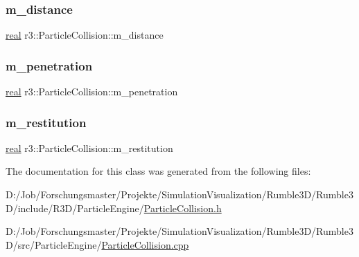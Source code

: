 \subsubsection{\texorpdfstring{m\+\_\+distance}{m\_distance}}
{\footnotesize\ttfamily \mbox{\hyperlink{namespacer3_ab2016b3e3f743fb735afce242f0dc1eb}{real}} r3\+::\+Particle\+Collision\+::m\+\_\+distance\hspace{0.3cm}{\ttfamily [protected]}}

\mbox{\label{classr3_1_1_particle_collision_a4e27e43b9a17e4a1d04ff91b808b4da9}} 
\subsubsection{\texorpdfstring{m\+\_\+penetration}{m\_penetration}}
{\footnotesize\ttfamily \mbox{\hyperlink{namespacer3_ab2016b3e3f743fb735afce242f0dc1eb}{real}} r3\+::\+Particle\+Collision\+::m\+\_\+penetration\hspace{0.3cm}{\ttfamily [protected]}}

\mbox{\label{classr3_1_1_particle_collision_a02dd7e5f227a429bcb707ad46adeb292}} 
\subsubsection{\texorpdfstring{m\+\_\+restitution}{m\_restitution}}
{\footnotesize\ttfamily \mbox{\hyperlink{namespacer3_ab2016b3e3f743fb735afce242f0dc1eb}{real}} r3\+::\+Particle\+Collision\+::m\+\_\+restitution\hspace{0.3cm}{\ttfamily [protected]}}



The documentation for this class was generated from the following files\+:\begin{DoxyCompactItemize}
\item 
D\+:/\+Job/\+Forschungsmaster/\+Projekte/\+Simulation\+Visualization/\+Rumble3\+D/\+Rumble3\+D/include/\+R3\+D/\+Particle\+Engine/\mbox{\hyperlink{_particle_collision_8h}{Particle\+Collision.\+h}}\item 
D\+:/\+Job/\+Forschungsmaster/\+Projekte/\+Simulation\+Visualization/\+Rumble3\+D/\+Rumble3\+D/src/\+Particle\+Engine/\mbox{\hyperlink{_particle_collision_8cpp}{Particle\+Collision.\+cpp}}\end{DoxyCompactItemize}
